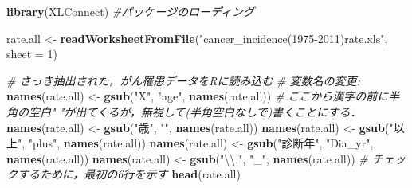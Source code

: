 \documentclass[11pt,]{article}
\newenvironment{Shaded}{\begin{snugshade}}{\end{snugshade}}
\newcommand{\KeywordTok}[1]{\textcolor[rgb]{0.13,0.29,0.53}{\textbf{{#1}}}}
\newcommand{\DataTypeTok}[1]{\textcolor[rgb]{0.13,0.29,0.53}{{#1}}}
\newcommand{\DecValTok}[1]{\textcolor[rgb]{0.00,0.00,0.81}{{#1}}}
\newcommand{\CharTok}[1]{\textcolor[rgb]{0.31,0.60,0.02}{{#1}}}
\newcommand{\StringTok}[1]{\textcolor[rgb]{0.31,0.60,0.02}{{#1}}}
\newcommand{\CommentTok}[1]{\textcolor[rgb]{0.56,0.35,0.01}{\textit{{#1}}}}
\newcommand{\NormalTok}[1]{{#1}}
\begin{document}
\begin{Shaded}
\begin{Highlighting}[]
\KeywordTok{library}\NormalTok{(XLConnect) }\CommentTok{#パッケージのローディング}

\NormalTok{rate.all <-}\StringTok{ }\KeywordTok{readWorksheetFromFile}\NormalTok{(}\StringTok{"cancer_incidence(1975-2011)rate.xls"}\NormalTok{,}
                                  \DataTypeTok{sheet =} \DecValTok{1}\NormalTok{)}

\CommentTok{#  さっき抽出された，がん罹患データをRに読み込む}
\CommentTok{#  変数名の変更: }
\KeywordTok{names}\NormalTok{(rate.all) <-}\StringTok{ }\KeywordTok{gsub}\NormalTok{(}\StringTok{"X"}\NormalTok{, }\StringTok{"age"}\NormalTok{, }\KeywordTok{names}\NormalTok{(rate.all))}
\CommentTok{# ここから漢字の前に半角の空白" "が出てくるが，無視して(半角空白なしで)書くことにする．}
\KeywordTok{names}\NormalTok{(rate.all) <-}\StringTok{ }\KeywordTok{gsub}\NormalTok{(}\StringTok{"歳"}\NormalTok{, }\StringTok{""}\NormalTok{, }\KeywordTok{names}\NormalTok{(rate.all)) }
\KeywordTok{names}\NormalTok{(rate.all) <-}\StringTok{ }\KeywordTok{gsub}\NormalTok{(}\StringTok{"以上"}\NormalTok{, }\StringTok{"plus"}\NormalTok{, }\KeywordTok{names}\NormalTok{(rate.all))}
\KeywordTok{names}\NormalTok{(rate.all) <-}\StringTok{ }\KeywordTok{gsub}\NormalTok{(}\StringTok{"診断年"}\NormalTok{, }\StringTok{"Dia_yr"}\NormalTok{, }\KeywordTok{names}\NormalTok{(rate.all))}
\KeywordTok{names}\NormalTok{(rate.all) <-}\StringTok{ }\KeywordTok{gsub}\NormalTok{(}\StringTok{"}\CharTok{\textbackslash{}\textbackslash{}}\StringTok{."}\NormalTok{, }\StringTok{"_"}\NormalTok{, }\KeywordTok{names}\NormalTok{(rate.all))}
\CommentTok{#  チェックするために，最初の6行を示す}
\KeywordTok{head}\NormalTok{(rate.all)}
\end{Highlighting}
\end{Shaded}
\end{document}
